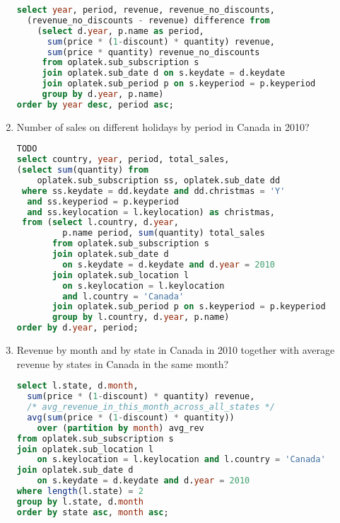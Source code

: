 \begin{enumerate}
\begin{lstlisting}[language=sql]
select year, period, revenue, revenue_no_discounts, 
  (revenue_no_discounts - revenue) difference from 
    (select d.year, p.name as period, 
      sum(price * (1-discount) * quantity) revenue, 
      sum(price * quantity) revenue_no_discounts
     from oplatek.sub_subscription s 
     join oplatek.sub_date d on s.keydate = d.keydate
     join oplatek.sub_period p on s.keyperiod = p.keyperiod
     group by d.year, p.name)
order by year desc, period asc;
\end{lstlisting}
  \item Number of sales on different holidays by period in Canada in 2010?
\begin{lstlisting}[language=sql] 
TODO
select country, year, period, total_sales, 
(select sum(quantity) from 
    oplatek.sub_subscription ss, oplatek.sub_date dd 
 where ss.keydate = dd.keydate and dd.christmas = 'Y' 
  and ss.keyperiod = p.keyperiod 
  and ss.keylocation = l.keylocation) as christmas,
 from (select l.country, d.year, 
         p.name period, sum(quantity) total_sales
       from oplatek.sub_subscription s 
       join oplatek.sub_date d 
         on s.keydate = d.keydate and d.year = 2010
       join oplatek.sub_location l 
         on s.keylocation = l.keylocation 
         and l.country = 'Canada'
       join oplatek.sub_period p on s.keyperiod = p.keyperiod 
       group by l.country, d.year, p.name)
order by d.year, period;
\end{lstlisting}
  \item Revenue by month and by state in Canada in 2010 together with average revenue by states in Canada in the same month?
\begin{lstlisting}[language=sql] 
select l.state, d.month, 
  sum(price * (1-discount) * quantity) revenue,
  /* avg_revenue_in_this_month_across_all_states */
  avg(sum(price * (1-discount) * quantity)) 
    over (partition by month) avg_rev 
from oplatek.sub_subscription s 
join oplatek.sub_location l 
    on s.keylocation = l.keylocation and l.country = 'Canada' 
join oplatek.sub_date d 
    on s.keydate = d.keydate and d.year = 2010
where length(l.state) = 2
group by l.state, d.month
order by state asc, month asc;
\end{lstlisting}
\end{enumerate}


